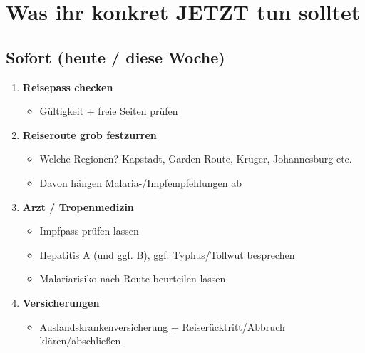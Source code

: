 \documentclass[12pt,a4paper]{article}
\begin{document}
\newpage
\section{Was ihr konkret JETZT tun solltet}

\subsection{Sofort (heute / diese Woche)}

\begin{warnbox}[title={\faCalendarCheck \hspace{0.2cm} Höchste Priorität}]

\begin{enumerate}[leftmargin=*,label={\color{warningred}\bfseries\arabic*.}]
    \item \textbf{Reisepass checken}
    \begin{itemize}[label={\color{warningred}\faChevronRight}]
        \item Gültigkeit + freie Seiten prüfen
    \end{itemize}

    \item \textbf{Reiseroute grob festzurren}
    \begin{itemize}[label={\color{warningred}\faChevronRight}]
        \item Welche Regionen? Kapstadt, Garden Route, Kruger, Johannesburg etc.
        \item Davon hängen Malaria-/Impfempfehlungen ab
    \end{itemize}

    \item \textbf{Arzt / Tropenmedizin}
    \begin{itemize}[label={\color{warningred}\faChevronRight}]
        \item Impfpass prüfen lassen
        \item Hepatitis A (und ggf. B), ggf. Typhus/Tollwut besprechen
        \item Malariarisiko nach Route beurteilen lassen\cite{safari-memories-2}
    \end{itemize}

    \item \textbf{Versicherungen}
    \begin{itemize}[label={\color{warningred}\faChevronRight}]
        \item Auslandskrankenversicherung + Reiserücktritt/Abbruch klären/abschließen\cite{adac-gesundheit-2}
    \end{itemize}
\end{enumerate}

\end{warnbox}
\end{document}
